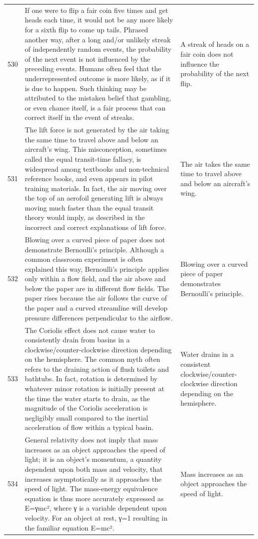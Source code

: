 \begin{tabular}{c|p{}|p{}}
530 & If one were to flip a fair coin five times and get heads each time, it would not be any more likely for a sixth flip to come up tails. Phrased another way, after a long and/or unlikely streak of independently random events, the probability of the next event is not influenced by the preceding events. Humans often feel that the underrepresented outcome is more likely, as if it is due to happen. Such thinking may be attributed to the mistaken belief that gambling, or even chance itself, is a fair process that can correct itself in the event of streaks. & A streak of heads on a fair coin does not influence the probability of the next flip. \\
531 & The lift force is not generated by the air taking the same time to travel above and below an aircraft's wing. This misconception, sometimes called the equal transit-time fallacy, is widespread among textbooks and non-technical reference books, and even appears in pilot training materials. In fact, the air moving over the top of an aerofoil generating lift is always moving much faster than the equal transit theory would imply, as described in the incorrect and correct explanations of lift force. & The air takes the same time to travel above and below an aircraft's wing. \\
532 & Blowing over a curved piece of paper does not demonstrate Bernoulli's principle. Although a common classroom experiment is often explained this way, Bernoulli's principle applies only within a flow field, and the air above and below the paper are in different flow fields. The paper rises because the air follows the curve of the paper and a curved streamline will develop pressure differences perpendicular to the airflow. & Blowing over a curved piece of paper demonstrates Bernoulli's principle. \\
533 & The Coriolis effect does not cause water to consistently drain from basins in a clockwise/counter-clockwise direction depending on the hemisphere. The common myth often refers to the draining action of flush toilets and bathtubs. In fact, rotation is determined by whatever minor rotation is initially present at the time the water starts to drain, as the magnitude of the Coriolis acceleration is negligibly small compared to the inertial acceleration of flow within a typical basin. & Water drains in a consistent clockwise/counter-clockwise direction depending on the hemisphere. \\
534 & General relativity does not imply that mass increases as an object approaches the speed of light; it is an object's momentum, a quantity dependent upon both mass and velocity, that increases asymptotically as it approaches the speed of light. The mass-energy equivalence equation is thus more accurately expressed as E=γmc², where γ is a variable dependent upon velocity. For an object at rest, γ=1 resulting in the familiar equation E=mc². & Mass increases as an object approaches the speed of light. \\

\end{tabular}
